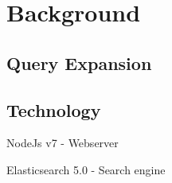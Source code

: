 \chapter{Background}
\section{Query Expansion}
\section{Technology}
NodeJs v7 - Webserver

Elasticsearch 5.0 - Search engine
